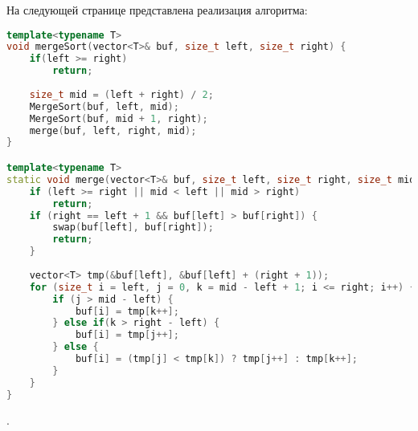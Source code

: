 На следующей странице представлена реализация алгоритма:\newpage
\begin{lstlisting}[language=C++]
template<typename T>
void mergeSort(vector<T>& buf, size_t left, size_t right) {
    if(left >= right)
    	return;
  
 	size_t mid = (left + right) / 2;
    MergeSort(buf, left, mid);
    MergeSort(buf, mid + 1, right);
    merge(buf, left, right, mid);
}

template<typename T>
static void merge(vector<T>& buf, size_t left, size_t right, size_t mid) {
    if (left >= right || mid < left || mid > right) 
    	return;
    if (right == left + 1 && buf[left] > buf[right]) {
        swap(buf[left], buf[right]);
        return;
    }
 
    vector<T> tmp(&buf[left], &buf[left] + (right + 1));
    for (size_t i = left, j = 0, k = mid - left + 1; i <= right; i++) {
        if (j > mid - left) {      
            buf[i] = tmp[k++];
        } else if(k > right - left) {
            buf[i] = tmp[j++];
        } else {
            buf[i] = (tmp[j] < tmp[k]) ? tmp[j++] : tmp[k++];
        }
    }
}
\end{lstlisting}
.